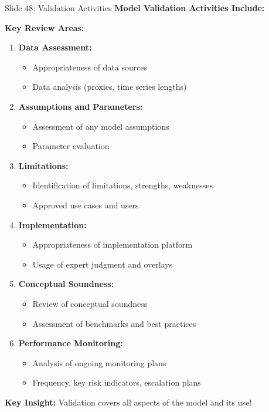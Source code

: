 \documentclass[8pt]{beamer}
\begin{document}
	\begin{frame}{Slide 48: Validation Activities}
		\fontsize{6.5}{7.5}\selectfont
		\textbf{Model Validation Activities Include:}
		
		\vspace{0.1cm}
		\textbf{Key Review Areas:}
		\begin{enumerate}
			\item \textbf{Data Assessment:}
			\begin{itemize}
				\item Appropriateness of data sources
				\item Data analysis (proxies, time series lengths)
			\end{itemize}
			\item \textbf{Assumptions and Parameters:}
			\begin{itemize}
				\item Assessment of any model assumptions
				\item Parameter evaluation
			\end{itemize}
			\item \textbf{Limitations:}
			\begin{itemize}
				\item Identification of limitations, strengths, weaknesses
				\item Approved use cases and users
			\end{itemize}
			\item \textbf{Implementation:}
			\begin{itemize}
				\item Appropriateness of implementation platform
				\item Usage of expert judgment and overlays
			\end{itemize}
			\item \textbf{Conceptual Soundness:}
			\begin{itemize}
				\item Review of conceptual soundness
				\item Assessment of benchmarks and best practices
			\end{itemize}
			\item \textbf{Performance Monitoring:}
			\begin{itemize}
				\item Analysis of ongoing monitoring plans
				\item Frequency, key risk indicators, escalation plans
			\end{itemize}
		\end{enumerate}
		
		\textcolor{myblue}{\textbf{Key Insight:}} Validation covers \textcolor{myblue}{all aspects of the model and its use}!
	\end{frame}
	
\end{document}
